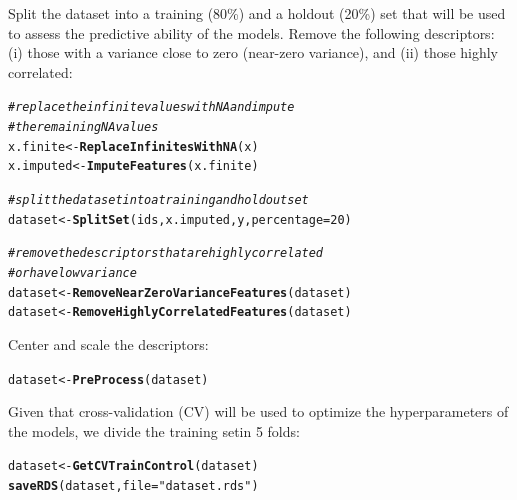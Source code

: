 \documentclass[twoside,a4wide,12pt]{article}\usepackage[]{graphicx}\usepackage[]{color}
\makeatletter
\newcommand{\hlnum}[1]{\textcolor[rgb]{0.686,0.059,0.569}{#1}}%
\newcommand{\hlstr}[1]{\textcolor[rgb]{0.192,0.494,0.8}{#1}}%
\newcommand{\hlcom}[1]{\textcolor[rgb]{0.678,0.584,0.686}{\textit{#1}}}%
\newcommand{\hlstd}[1]{\textcolor[rgb]{0.345,0.345,0.345}{#1}}%
\newcommand{\hlkwb}[1]{\textcolor[rgb]{0.69,0.353,0.396}{#1}}%
\newcommand{\hlkwc}[1]{\textcolor[rgb]{0.333,0.667,0.333}{#1}}%
\newcommand{\hlkwd}[1]{\textcolor[rgb]{0.737,0.353,0.396}{\textbf{#1}}}%
\newenvironment{kframe}{%
 \def\at@end@of@kframe{}%
 \ifinner\ifhmode%
  \def\at@end@of@kframe{\end{minipage}}%
  \begin{minipage}{\columnwidth}%
 \fi\fi%
 \def\FrameCommand##1{\hskip\@totalleftmargin \hskip-\fboxsep
 \colorbox{shadecolor}{##1}\hskip-\fboxsep
     \hskip-\linewidth \hskip-\@totalleftmargin \hskip\columnwidth}%
 \MakeFramed {\advance\hsize-\width
   \@totalleftmargin\z@ \linewidth\hsize
   \@setminipage}}%
 {\par\unskip\endMakeFramed%
 \at@end@of@kframe}
\newenvironment{knitrout}{}{} %
\makeatother
\begin{document}
Split the dataset into a training (80\%) and a holdout (20\%) set that will be used to assess the predictive ability of the models. Remove the following descriptors: (i) those with a variance close to zero (near-zero variance), and (ii) those highly correlated:
\begin{knitrout}
\color{fgcolor}\begin{kframe}
\begin{alltt}
\hlcom{# replace the infinite values with NA and impute}
\hlcom{# the remaining NA values}
\hlstd{x.finite} \hlkwb{<-} \hlkwd{ReplaceInfinitesWithNA}\hlstd{(x)}
\hlstd{x.imputed} \hlkwb{<-} \hlkwd{ImputeFeatures}\hlstd{(x.finite)}

\hlcom{# split the dataset into a training and holdout set}
\hlstd{dataset} \hlkwb{<-} \hlkwd{SplitSet}\hlstd{(ids, x.imputed, y,} \hlkwc{percentage} \hlstd{=} \hlnum{20}\hlstd{)}

\hlcom{# remove the descriptors that are highly correlated}
\hlcom{# or have low variance}
\hlstd{dataset} \hlkwb{<-} \hlkwd{RemoveNearZeroVarianceFeatures}\hlstd{(dataset)}
\hlstd{dataset} \hlkwb{<-} \hlkwd{RemoveHighlyCorrelatedFeatures}\hlstd{(dataset)}
\end{alltt}
\end{kframe}
\end{knitrout}


Center and scale the descriptors:
\begin{knitrout}
\color{fgcolor}\begin{kframe}
\begin{alltt}
\hlstd{dataset} \hlkwb{<-} \hlkwd{PreProcess}\hlstd{(dataset)}
\end{alltt}
\end{kframe}
\end{knitrout}


Given that cross-validation (CV) will be used to optimize the hyperparameters of the models, we divide the training setin 5 folds:
\begin{knitrout}
\color{fgcolor}\begin{kframe}
\begin{alltt}
\hlstd{dataset} \hlkwb{<-} \hlkwd{GetCVTrainControl}\hlstd{(dataset)}
\hlkwd{saveRDS}\hlstd{(dataset,} \hlkwc{file} \hlstd{=} \hlstr{"dataset.rds"}\hlstd{)}
\end{alltt}
\end{kframe}
\end{knitrout}
\end{document}
